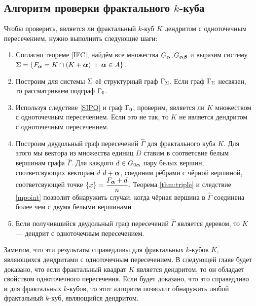 \subsection{Алгоритм проверки фрактального $k$-куба}

Чтобы проверить, является ли фрактальный $k$-куб $K$ дендритом с одноточечным пересечением, нужно выполнить следующие шаги:

\begin{enumerate}

\item Cогласно теореме \ref{IFC}, найдём все множества $G_{\bm{\alpha}}, G_{{\bm{\alpha}}{\bm{\beta}}}$ и выразим систему $\Sigma=\{F_{\bm{\alpha}}=K\cap(K+{\bm{\alpha}})\ :\ {\bm{\alpha}}\in A\}$.

\item Построим для системы $\Sigma$ её структурный граф $\Gamma_\Sigma$.
Если граф $\Gamma_\Sigma$ несвязен, то рассматриваем подграф $\Gamma_0$.
 
\item Используя следствие \ref{SIPQ} и граф $\Gamma_0$, проверим, является ли $K$ множеством с одноточечным пересечением.
Если это не так, то $K$ не является дендритом с одноточечным пересечением.
    
\item Построим двудольный граф пересечений $\hat\Gamma$ для фрактального куба $K$.
Для этого мы вектора из множества единиц $D$ ставим в соответсвие белым вершинам графа $\hat\Gamma$.
Для каждого $d\in G_{0{\bm{\alpha}}}$ пару белых вершин, соответсвующих векторам $d$ $d+{\bm{\alpha}}$, соединим рёбрами с чёрной вершиной, соответсвующей точке $\{x\}=\dfrac{F_{\bm{\alpha}}+d}{n}$. 
Теорема \ref{thm:triple} и следствие \ref{mpoint} позволит обнаружить случаи, когда чёрная вершина в $\hat\Gamma$ соединена более чем с двумя белыми вершинами

\item Если получившийся двудольный граф пересечений $\hat\Gamma$ является деревом, то $K$ --- дендрит с одноточечным пересечением.    
\end{enumerate}

\begin{remark}
Заметим, что эти результаты справедливы для фрактальных $k$-кубов $K$, являющихся дендритами с одноточечным пересечением.
В следующей главе будет доказано, что если фрактальный квадрат $K$ является дендритом, то он обладает свойством одноточечного пересечения.
Если будет доказано, что это справедливо и для фрактальных $k$-кубов, то этот алгоритм позволит обнаружить любой фрактальный $k$-куб, являющийся дендритом.
\end{remark}

